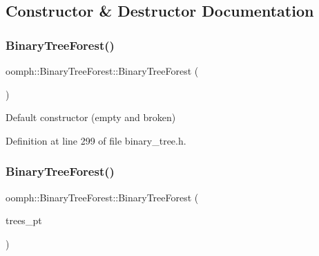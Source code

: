 \subsection{Constructor \& Destructor Documentation}
\mbox{\label{classoomph_1_1BinaryTreeForest_a0185044e57a122d19fef2a5c9256a74b}} 
\subsubsection{\texorpdfstring{Binary\+Tree\+Forest()}{BinaryTreeForest()}\hspace{0.1cm}{\footnotesize\ttfamily [1/3]}}
{\footnotesize\ttfamily oomph\+::\+Binary\+Tree\+Forest\+::\+Binary\+Tree\+Forest (\begin{DoxyParamCaption}{ }\end{DoxyParamCaption})\hspace{0.3cm}{\ttfamily [inline]}}



Default constructor (empty and broken) 



Definition at line 299 of file binary\+\_\+tree.\+h.

\mbox{\label{classoomph_1_1BinaryTreeForest_a534e8527d8701034afb5a8d6ab343de2}} 
\subsubsection{\texorpdfstring{Binary\+Tree\+Forest()}{BinaryTreeForest()}\hspace{0.1cm}{\footnotesize\ttfamily [2/3]}}
{\footnotesize\ttfamily oomph\+::\+Binary\+Tree\+Forest\+::\+Binary\+Tree\+Forest (\begin{DoxyParamCaption}\item[{\hyperlink{classoomph_1_1Vector}{Vector}$<$ \hyperlink{classoomph_1_1TreeRoot}{Tree\+Root} $\ast$ $>$ \&}]{trees\+\_\+pt }\end{DoxyParamCaption})}



